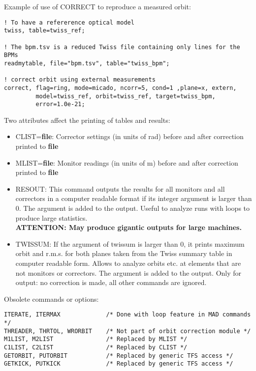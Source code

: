 Example of use of CORRECT to reproduce a measured orbit: 
\begin{verbatim}
! To have a refererence optical model
twiss, table=twiss_ref;

! The bpm.tsv is a reduced Twiss file containing only lines for the BPMs
readmytable, file="bpm.tsv", table="twiss_bpm";

! correct orbit using external measurements
correct, flag=ring, mode=micado, ncorr=5, cond=1 ,plane=x, extern,
         model=twiss_ref, orbit=twiss_ref, target=twiss_bpm, 
         error=1.0e-21;
\end{verbatim}


Two attributes affect the printing of tables and results: 
\begin{itemize}
   \item CLIST=\textbf{file}: Corrector settings (in units of rad)
     before and after correction printed to \textbf{file} 

   \item MLIST=\textbf{file}: Monitor readings (in units of m) before
     and after correction printed to \textbf{file} 

   \item RESOUT: This command outputs the results for all monitors and
     all correctors in a computer readable format if its integer
     argument is larger than 0. The argument is added to the
     output. Useful to analyze runs with loops to produce large
     statistics. 
     \\\textbf{ATTENTION: May produce gigantic outputs for large
       machines.} 
     \\

   \item TWISSUM:  If the argument of twissum is larger than 0, it
     prints maximum orbit and r.m.s. for both planes taken from the
     Twiss summary table in computer readable form. Allows to analyze
     orbits etc. at elements that are not monitors or correctors. The
     argument is added to the output.  Only for output: no correction is
     made, all other commands are ignored.  
\end{itemize}

Obsolete commands or options:
\begin{verbatim}
ITERATE, ITERMAX             /* Done with loop feature in MAD commands */
THREADER, THRTOL, WRORBIT    /* Not part of orbit correction module */
M1LIST, M2LIST               /* Replaced by MLIST */
C1LIST, C2LIST               /* Replaced by CLIST */
GETORBIT, PUTORBIT           /* Replaced by generic TFS access */
GETKICK, PUTKICK             /* Replaced by generic TFS access */
\end{verbatim}


